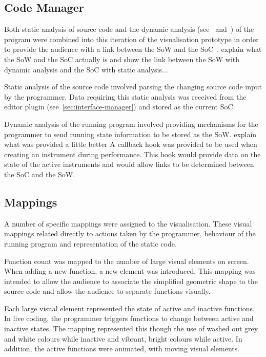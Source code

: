 \more

\subsection{Code Manager}

Both static analysis of source code and the dynamic analysis (see~\cite{Eisenbarth2003} and~\cite{Jerding1997}) of the program were combined into this iteration of the visualisation prototype in order to provide the audience with a link between the \ac{SoW} and the \ac{SoC}~\cite{Swift2013}. {\color{red} explain what the \ac{SoW} and the \ac{SoC} actually is and show the link between the \ac{SoW} with dynamic analysis and the \ac{SoC} with static analysis...}

Static analysis of the source code involved parsing the changing source code input by the programmer. Data requiring this static analysis was received from the editor plugin (see~\ref{sec:interface-manager}) and stored as the current \ac{SoC}.

Dynamic analysis of the running program involved providing mechanisms for the programmer to send running state information to be stored as the \ac{SoW}. {\color{red} explain what was provided a little better} A callback hook was provided to be used when creating an instrument during performance. This hook would provide data on the state of the active instruments and would allow links to be determined between the \ac{SoC} and the \ac{SoW}.

\subsection{Mappings}

A number of specific mappings were assigned to the visualisation. These visual mappings related directly to actions taken by the programmer, behaviour of the running program and representation of the static code. 

Function count was mapped to the number of large visual elements on screen. When adding a new function, a new element was introduced. This mapping was intended to allow the audience to associate the simplified geometric shape to the source code and allow the audience to separate functions visually.

Each large visual element represented the state of active and inactive functions. In live coding, the programmer triggers functions to change between active and inactive states. The mapping represented this though the use of washed out grey and white colours while inactive and vibrant, bright colours while active. In addition, the active functions were animated, with moving visual elements.

